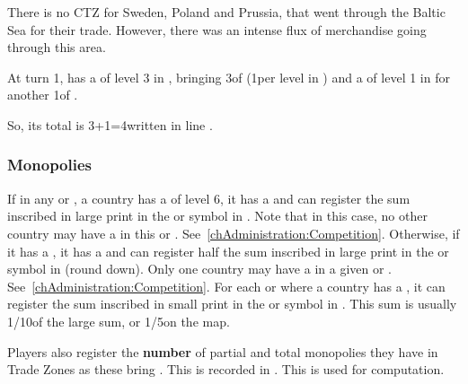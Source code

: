 \begin{designnote}
  There is no CTZ for Sweden, Poland and Prussia, that went through the
  Baltic Sea for their trade. However, there was an intense flux of
  merchandise going through this area.
\end{designnote}


\begin{exemple}
  At turn 1, \POR has a \TradeFLEET of level 3 in ,
  bringing 3\ducats of  (1\ducats per level in \STZ)
  and a \TradeFLEET of level 1 in  for another 1\ducats of
  .

  So, its total  is 3+1=4\ducats written in
  line .
\end{exemple}

\subsubsection{Monopolies}\label{chIncomes:Commercial Monopoly}
\aparag If in any \CTZ or \STZ, a country has a \TradeFLEET of level 6,
it has a  and can register the sum inscribed in
large print in the \CTZ or \STZ symbol in .
\bparag Note that in this case, no other country may have a \TradeFLEET
in this \CTZ or \STZ. See~\ref{chAdministration:Competition}.
\aparag Otherwise, if it has a \TradeFLEET\faceplus, it has a
 and can register half the sum inscribed in
large print in the \CTZ or \STZ symbol in  (round down).
\bparag Only one country may have a \TradeFLEET\faceplus in a given \CTZ
or \STZ. See~\ref{chAdministration:Competition}.
\aparag For each \CTZ or \STZ where a country has a
\TradeFLEET\facemoins, it can register the sum inscribed in small print
in the \CTZ or \STZ symbol in .
\bparag This sum is usually 1/10\th of the large sum, or 1/5\th on the
\ROTW map.

\aparag Players also register the \textbf{number} of partial and total
monopolies they have in Trade Zones as these bring \VPs. This is
recorded in . This is used
for \VPs computation.

